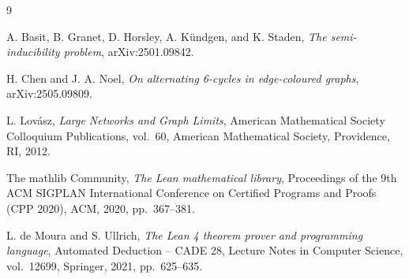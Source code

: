 \documentclass[11pt]{article}
\begin{document}
\begin{thebibliography}{9}

A. Basit, B. Granet, D. Horsley, A. K\"undgen, and K. Staden,
\emph{The semi-inducibility problem},
arXiv:2501.09842.

H. Chen and J. A. Noel,
\emph{On alternating 6-cycles in edge-coloured graphs},
arXiv:2505.09809.

L. Lov\'asz,
\emph{Large Networks and Graph Limits},
American Mathematical Society Colloquium Publications, vol.~60,
American Mathematical Society, Providence, RI, 2012.

The mathlib Community,
\emph{The Lean mathematical library},
Proceedings of the 9th ACM SIGPLAN International Conference on
Certified Programs and Proofs (CPP 2020), ACM, 2020, pp.~367--381.

L. de Moura and S. Ullrich,
\emph{The Lean 4 theorem prover and programming language},
Automated Deduction -- CADE 28, Lecture Notes in Computer Science,
vol.~12699, Springer, 2021, pp.~625--635.

\end{thebibliography}
\end{document}
